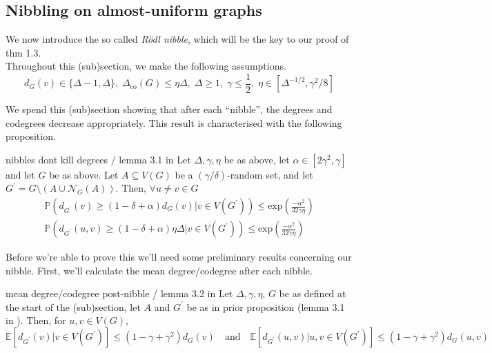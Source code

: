 \documentclass{article}
\begin{document}
\subsection{Nibbling on almost-uniform graphs}

We now introduce the so called {\it R\"{o}dl nibble}, which will be the key to our proof of thm 1.3. \\

Throughout this (sub)section, we make the following assumptions. 
\[d_G(v) \in \{\Delta -1, \Delta\}, \; \Delta_{\text{co}}(G) \leq \eta \Delta, \; \Delta \geq 1, \; 
\gamma \leq \frac{1}{2}, \; \eta \in [\Delta^{-1/2}, \gamma^2/8]\]

We spend this (sub)section showing that after each ``nibble'', the degrees and codegrees decrease appropriately. This 
result is characterised with the following proposition. 

\begin{proposition}[]{nibbles dont kill degrees / lemma 3.1 in \cite{campos2023}}
    Let $\Delta, \gamma, \eta$ be as above, let $\alpha \in [2\gamma^2, \gamma]$ and let $G$ be as above. Let 
    $A \subseteq V(G)$ be a $(\gamma/\delta)$-random set, and let $G^\prime = G \setminus (A \cup \mathcal{N}_G(A))$.
    Then, $\forall u \neq v \in G$ 
    \begin{align*}
        \mathbb{P}(d_{G^\prime}(v) \geq (1 - \delta + \alpha)d_G(v) | v \in V(G^\prime)) \leq \text{exp}\left(\frac{-\alpha^2}{32\gamma\eta}\right) \\
        \mathbb{P}(d_{G^\prime}(u,v) \geq (1 - \delta + \alpha)\eta\Delta | v \in V(G^\prime)) \leq \text{exp}\left(\frac{-\alpha^2}{32\gamma\eta}\right)
    \end{align*}
\end{proposition}

Before we're able to prove this we'll need some preliminary results concerning our nibble. First, we'll calculate the 
mean degree/codegree after each nibble. 

\begin{lemma}[]{mean degree/codegree post-nibble / lemma 3.2 in \cite{campos2023}}
    Let $\Delta, \gamma, \eta$, $G$ be as defined at the start of the (sub)section, let $A$ and $G^\prime$ be as in 
    prior proposition (lemma 3.1 in \cite{campos2023}). Then, for $u, v \in V(G)$, 
    \[\mathbb{E}[d_{G^\prime}(v) | v \in V(G^\prime)] \leq (1 - \gamma + \gamma^2)d_G(v) \quad \text{and} \quad
    \mathbb{E}[d_{G^\prime}(u, v) | u, v \in V(G^\prime)] \leq (1 - \gamma + \gamma^2)d_G(u, v)\]
\end{lemma}
\end{document}
